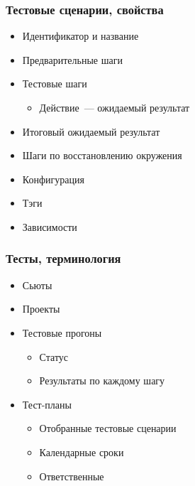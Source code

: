 \documentclass{../../slides-style}
\begin{document}
    \begin{frame}
        \frametitle{Тестовые сценарии, свойства}
        \begin{itemize}
            \item Идентификатор и название
            \item Предварительные шаги
            \item Тестовые шаги
            \begin{itemize}
                \item Действие~--- ожидаемый результат
            \end{itemize} 
            \item Итоговый ожидаемый результат
            \item Шаги по восстановлению окружения
            \item Конфигурация
            \item Тэги
            \item Зависимости
        \end{itemize}
    \end{frame}

    \begin{frame}
        \frametitle{Тесты, терминология}
        \begin{itemize}
            \item Сьюты
            \item Проекты
            \item Тестовые прогоны
            \begin{itemize}
                \item Статус
                \item Результаты по каждому шагу
            \end{itemize}
            \item Тест-планы
            \begin{itemize}
                \item Отобранные тестовые сценарии
                \item Календарные сроки
                \item Ответственные
            \end{itemize}
        \end{itemize}
    \end{frame}
\end{document}
